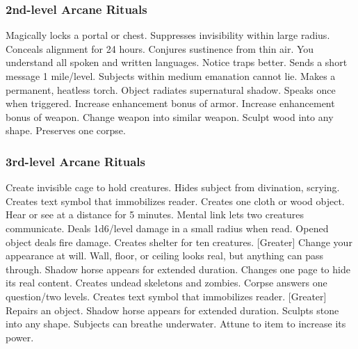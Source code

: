\subsubsection{2nd-level Arcane Rituals}
\begin{rituallist}
     Magically locks a portal or chest.
     Suppresses invisibility within large radius.
     Conceals alignment for 24 hours.
     Conjures sustinence from thin air.
     You understand all spoken and written languages.
     Notice traps better.
     Sends a short message 1 mile/level.
     Subjects within medium emanation cannot lie.
     Makes a permanent, heatless torch.
     Object radiates supernatural shadow.
     Speaks once when triggered.
     Increase enhancement bonus of armor.
     Increase enhancement bonus of weapon.
     Change weapon into similar weapon.
     Sculpt wood into any shape.
     Preserves one corpse.
\end{rituallist}

\subsubsection{3rd-level Arcane Rituals}
\begin{rituallist}
     Create invisible cage to hold creatures.
     Hides subject from divination, scrying.
     Creates text symbol that immobilizes reader.
     Creates one cloth or wood object.
     Hear or see at a distance for 5 minutes.
     Mental link lets two creatures communicate.
     Deals 1d6/level damage in a small radius when read.
     Opened object deals fire damage.
     Creates shelter for ten creatures.
    [Greater] Change your appearance at will.
     Wall, floor, or ceiling looks real, but anything can pass through.
     Shadow horse appears for extended duration.
     Changes one page to hide its real content.
     Creates undead skeletons and zombies.
     Corpse answers one question/two levels.
     Creates text symbol that immobilizes reader.
    [Greater] Repairs an object.
     Shadow horse appears for extended duration.
     Sculpts stone into any shape.
     Subjects can breathe underwater.
     Attune to item to increase its power.
\end{rituallist}

